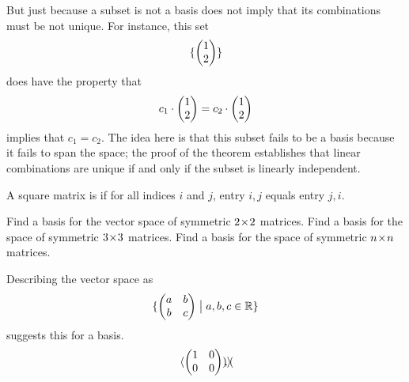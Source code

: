 \begin{exercises}
\begin{answer}
      But just because a subset is not a basis does not imply that its
      combinations must be not unique.
      For instance, this set 
      \begin{equation*}
        \mbox{$\{\begin{pmatrix} 1 \\ 2 \end{pmatrix}\}$}
      \end{equation*}
      does have the property that
      \begin{equation*}
        c_1\cdot\begin{pmatrix} 1 \\ 2 \end{pmatrix}
        =
        c_2\cdot\begin{pmatrix} 1 \\ 2 \end{pmatrix}
      \end{equation*}
      implies that $c_1=c_2$.
      The idea here is that this subset fails to be a basis because it fails
      to span the space; the proof of the theorem establishes that
      linear combinations are unique if and only if the subset is linearly
      independent.
     \end{answer}
  \recommended \item
    A square matrix is %
    if for all indices \( i \) and
    \( j \), entry \( i,j \) equals entry \( j,i \).
    \begin{exparts}
      \partsitem Find a basis for the vector space of
        symmetric \( 2 \! \times \! 2 \) matrices.
      \partsitem Find a basis for the space of symmetric \( 3 \! \times \! 3 \)
        matrices.
      \partsitem Find a basis for the space of symmetric \( n \! \times \! n \)
        matrices.
    \end{exparts}
    \begin{answer}
      \begin{exparts}
        \partsitem Describing the vector space as
          \begin{equation*}
             \mbox{$\{\begin{pmatrix}
                     a  &b  \\
                     b  &c
                  \end{pmatrix}  \bigm| a,b,c\in\mathbb{R}\}$}
          \end{equation*}
          suggests this for a basis.
          \begin{equation*}
            \langle
              \begin{pmatrix}
                1  &0  \\
                0  &0
              \end{pmatrix},
              \begin{pmatrix}

\end{pmatrix}\rangle
\end{equation*}
\end{exparts}
\end{answer}
\end{exercises}

